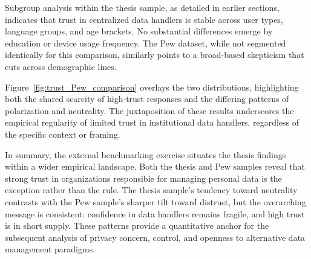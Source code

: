 		Subgroup analysis within the thesis sample, as detailed in earlier sections, indicates that trust in centralized data handlers is stable across user types, language groups, and age brackets. No substantial differences emerge by education or device usage frequency. The Pew dataset, while not segmented identically for this comparison, similarly points to a broad-based skepticism that cuts across demographic lines.
		
		Figure~\ref{fig:trust_Pew_comparison} overlays the two distributions, highlighting both the shared scarcity of high-trust responses and the differing patterns of polarization and neutrality. The juxtaposition of these results underscores the empirical regularity of limited trust in institutional data handlers, regardless of the specific context or framing.
		
		In summary, the external benchmarking exercise situates the thesis findings within a wider empirical landscape. Both the thesis and Pew samples reveal that strong trust in organizations responsible for managing personal data is the exception rather than the rule. The thesis sample’s tendency toward neutrality contrasts with the Pew sample’s sharper tilt toward distrust, but the overarching message is consistent: confidence in data handlers remains fragile, and high trust is in short supply. These patterns provide a quantitative anchor for the subsequent analysis of privacy concern, control, and openness to alternative data management paradigms.
